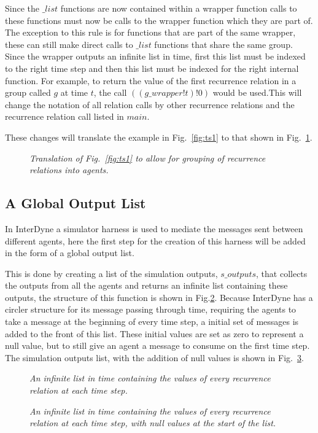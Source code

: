 \documentclass{article}
\begin{document}
Since the $\_list$ functions are now contained within a wrapper function calls to these functions must now be calls to the wrapper function which they are part of. The exception to this rule is for functions that are part of the same wrapper, these can still make direct calls to $\_list$ functions that share the same group. Since the wrapper outputs an infinite list in time, first this list must be indexed to the right time step and then this list must be indexed for the right internal function. For example, to return the value of the first recurrence relation in a group called $g$ at time $t$, the call $((g\_wrapper!t)!0)$ would be used.This will change the notation of all relation calls by other recurrence relations and the recurrence relation call listed in $main$. 

These changes will translate the example in Fig.~\ref{fig:ts1} to that shown in Fig.~\ref{fig:ts2}.
\begin{figure}[H]
	\centering
	
	\caption{\it Translation of Fig.~\ref{fig:ts1} to allow for grouping of recurrence relations into agents.}
	\label{fig:ts2}
\end{figure} 



\subsection{A Global Output List}
In InterDyne a simulator harness is used to mediate the messages sent between different agents, here the first step for the creation of this harness will be added in the form of a global output list. 

This is done by creating a list of the simulation outputs, $s\_outputs$, that collects the outputs from all the agents and returns an infinite list containing these outputs, the structure of this function is shown in Fig.\ref{fig:gl3}. Because InterDyne has a circler structure for its message passing through time, requiring the agents to take a message at the beginning of every time step, a initial set of messages is added to the front of this list. These initial values are set as zero to represent a null value, but to still give an agent a message to consume on the first time step. The simulation outputs list, with the addition of null values is shown in Fig.~\ref{fig:glnv3}. 
\begin{figure}[H]
	\centering
	
	\caption{\it  An infinite list in time containing the values of every recurrence relation at each time step.}
	\label{fig:gl3}
\end{figure}
\begin{figure}[H]
	\centering
	
	\caption{\it  An infinite list in time containing the values of every recurrence relation at each time step, with null values at the start of the list.}
	\label{fig:glnv3}
\end{figure}  
\end{document}
